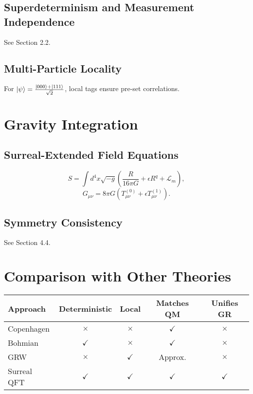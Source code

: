 \documentclass{article}
\begin{document}
\subsection{Superdeterminism and Measurement Independence}
See Section 2.2.

\subsection{Multi-Particle Locality}
For \(\ket{\psi} = \frac{\ket{000} + \ket{111}}{\sqrt{2}}\), local tags ensure pre-set correlations.

\section{Gravity Integration}
\subsection{Surreal-Extended Field Equations}
\begin{equation}
S = \int d^4x \sqrt{-g} \left( \frac{R}{16\pi G} + \epsilon R^q + \mathcal{L}_m \right),
\end{equation}
\begin{equation}
G_{\mu\nu} = 8\pi G \left( T_{\mu\nu}^{(0)} + \epsilon T_{\mu\nu}^{(1)} \right).
\end{equation}

\subsection{Symmetry Consistency}
See Section 4.4.

\section{Comparison with Other Theories}
\begin{center}
\begin{tabular}{lcccc}
\hline
\textbf{Approach} & \textbf{Deterministic} & \textbf{Local} & \textbf{Matches QM} & \textbf{Unifies GR} \\
\hline
Copenhagen & $\times$ & $\times$ & $\checkmark$ & $\times$ \\
Bohmian & $\checkmark$ & $\times$ & $\checkmark$ & $\times$ \\
GRW & $\times$ & $\checkmark$ & Approx. & $\times$ \\
Surreal QFT & $\checkmark$ & $\checkmark$ & $\checkmark$ & $\checkmark$ \\
\hline
\end{tabular}
\end{center}
\end{document}
